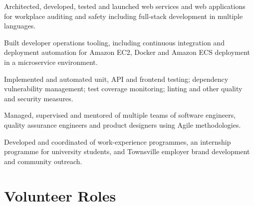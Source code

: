 \documentclass[]{tjd-cv}
\begin{document}
\begin{minipage}[t]{0.70\textwidth}
\begin{tightemize}
\item Architected, developed, tested and launched web services and web applications for workplace auditing and safety including full-stack development in multiple languages.
\item Built developer operations tooling, including continuous integration and deployment automation for Amazon EC2, Docker and Amazon ECS deployment in a microservice environment.
\item Implemented and automated unit, API and frontend testing; dependency vulnerability management; test coverage monitoring; linting and other quality and security measures.
\item Managed, supervised and mentored of multiple teams of software engineers, quality assurance engineers and product designers using Agile methodologies.
\item Developed and coordinated of work-experience programmes, an internship programme for university students, and Townsville employer brand development and community outreach.
\end{tightemize}
\sectionsep

\sectionsep


\section{Volunteer Roles}
\vspace{\topsep}
\sectionsep

\sectionsep

\end{minipage}
\end{document}
